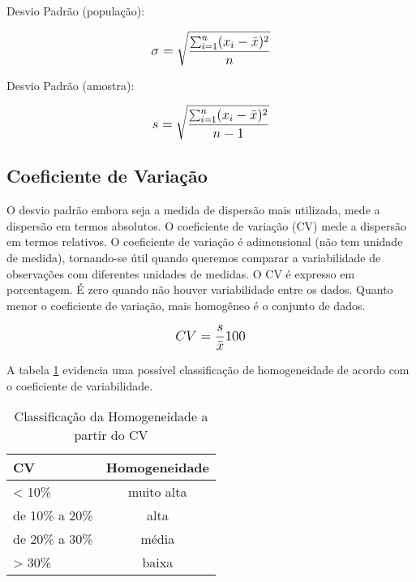 Desvio Padrão (população):

\[\beq{ \sigma=\sqrt{\frac{\sum_{i=1}^{n} (x_i - \bar{x})^2}{n}} }\]

Desvio Padrão (amostra):

\[\beq{ s=\sqrt{\frac{\sum_{i=1}^{n} (x_i - \bar{x})^2}{n-1}} }\]

\subsection{Coeficiente de Variação}

O desvio padrão embora seja a medida de dispersão mais utilizada, mede a dispersão em termos absolutos. O coeficiente de variação (CV) mede a dispersão em termos relativos. O coeficiente de variação é adimensional (não tem unidade de medida), tornando-se útil quando queremos comparar a variabilidade de observações com diferentes unidades de medidas. O CV é expresso em porcentagem. É zero quando não houver variabilidade entre os dados. Quanto menor o coeficiente de variação, mais
homogêneo é o conjunto de dados.

\[\beq{ CV=\frac{s}{\bar{x}} 100 }\]

\newpage

A tabela \ref{tab:coeficiente-variabilidade} evidencia uma possível classificação de homogeneidade de acordo com o coeficiente de variabilidade.

\begin{table}
	\centering	
	\caption{Classificação da Homogeneidade a partir do CV}
	\label{tab:coeficiente-variabilidade}
	\begin{tabular}{l|c} 
		CV 		& Homogeneidade	\\
		\hline
		< 10\%		& muito alta	\\
		de 10\% a 20\%	& alta		\\
		de 20\% a 30\%	& média		\\
		> 30\%			& baixa		
	\end{tabular}
\end{table}

